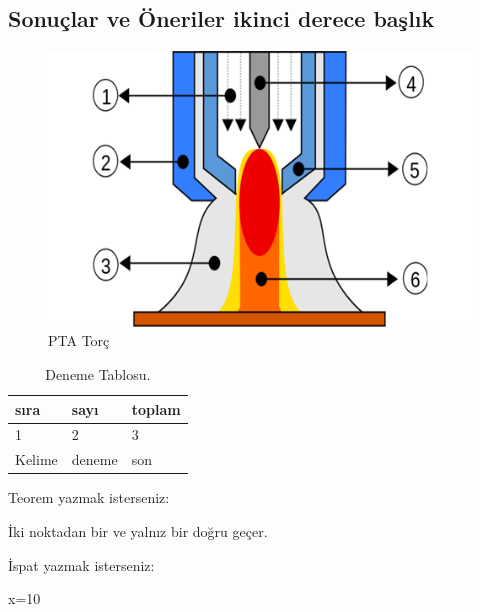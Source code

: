 \subsection{Sonuçlar ve Öneriler ikinci derece başlık}
\lipsum[1-2]
\begin{figure}[h]
\centering
\includegraphics[width=\textwidth]{gorseller/ptaTorc}
\caption{PTA Torç}\label{fig:PtaTorc1}
\end{figure}
\lipsum[1-2]
\begin{table}
\centering
\caption{Deneme Tablosu.}\label{tab:den1}
\begin{tabular}{|l|l|l|}
\hline
sıra   & sayı   & toplam \\ \hline
1      & 2      & 3      \\ \hline
Kelime & deneme & son    \\ \hline
\end{tabular}
\end{table}

Teorem yazmak isterseniz:
\begin{theorem}[Öklid]
 İki noktadan bir ve yalnız bir doğru geçer.
\end{theorem}

İspat yazmak isterseniz:
\begin{ispat}
x=10
\end{ispat}

